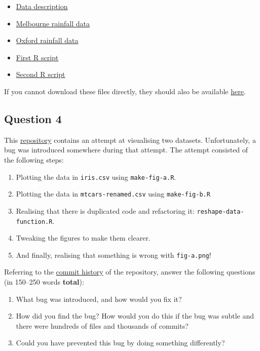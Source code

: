 \documentclass[11pt,onecolumn]{scrartcl}
\begin{document}
\begin{itemize}
\item \href{./homework-question-3/data-sources.txt}{Data description}
\item \href{./homework-question-3/melbourne.csv}{Melbourne rainfall data}
\item \href{./homework-question-3/oxford.txt}{Oxford rainfall data}
\item \href{./homework-question-3/combine-data.R}{First R script}
\item \href{./homework-question-3/make-plot.R}{Second R script}
\end{itemize}

If you cannot download these files directly, they should also be available \href{https://github.com/aezarebski/github-tutorial/tree/main/homework-question-3}{here}.

\subsection{Question 4}
\label{sec:org8fc4658}

This \href{https://github.com/aezarebski/biology-github-tutorial}{repository} contains an attempt at visualising two datasets. Unfortunately,
a bug was introduced somewhere during that attempt. The attempt consisted of the
following steps:

\begin{enumerate}
\item Plotting the data in \texttt{iris.csv} using \texttt{make-fig-a.R}.
\item Plotting the data in \texttt{mtcars-renamed.csv} using \texttt{make-fig-b.R}
\item Realising that there is duplicated code and refactoring it:
\texttt{reshape-data-function.R}.
\item Tweaking the figures to make them clearer.
\item And finally, realising that something is wrong with \texttt{fig-a.png}!
\end{enumerate}

Referring to the \href{https://github.com/aezarebski/biology-github-tutorial/commits/main}{commit history} of the repository, answer the following
questions (in 150--250 words \textbf{total}):

\begin{enumerate}
\item What bug was introduced, and how would you fix it?
\item How did you find the bug? How would you do this if the bug was subtle and
there were hundreds of files and thousands of commits?
\item Could you have prevented this bug by doing something differently?
\end{enumerate}
\end{document}
